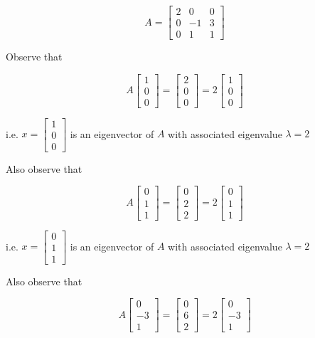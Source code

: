 \begin{example}
	\[A = \begin{bmatrix}
		2&0&0\\0&-1&3\\0&1&1
	\end{bmatrix}\]

	Observe that

	\[A \begin{bmatrix}
		1\\0\\0
	\end{bmatrix} = \begin{bmatrix}
		2\\0\\0
	\end{bmatrix} = 2 \begin{bmatrix}
		1\\0\\0
	\end{bmatrix}\] 
	
	i.e. $x = \begin{bmatrix}
		1\\0\\0
	\end{bmatrix}$ is an eigenvector of $A$ with associated eigenvalue $\lambda = 2$

	Also observe that 

	\[A \begin{bmatrix}
		0\\1\\1
	\end{bmatrix} = \begin{bmatrix}
		0\\2\\2
	\end{bmatrix} = 2 \begin{bmatrix}
		0\\1\\1
	\end{bmatrix}\]
	
	i.e. $x = \begin{bmatrix}
		0\\1\\1
	\end{bmatrix}$ is an eigenvector of $A$ with associated eigenvalue $\lambda = 2$

	Also observe that 

	\[A \begin{bmatrix}
		0\\-3\\1
	\end{bmatrix} = \begin{bmatrix}
		0\\6\\2
	\end{bmatrix} = 2 \begin{bmatrix}
		0\\-3\\1
	\end{bmatrix}\]
	

\end{example}
